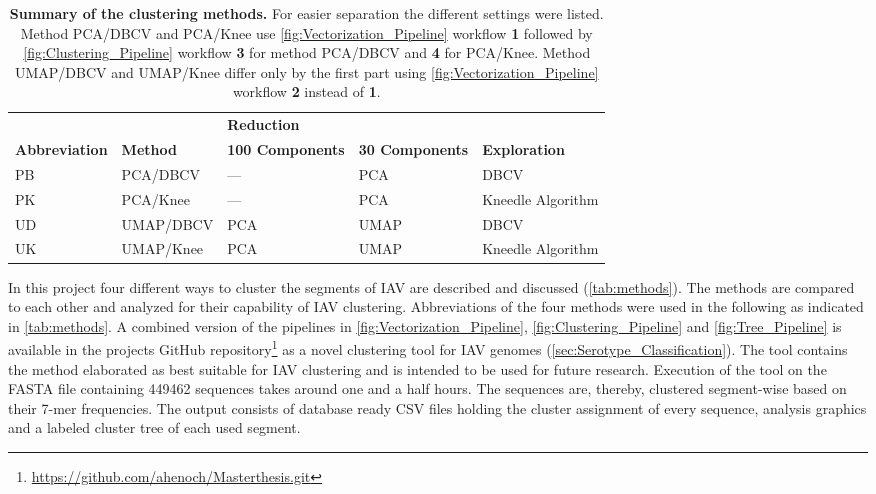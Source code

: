 \begin{table}[!hbt]
    \footnotesize
    \centering
    \caption[Summary of the clustering methods]{\textbf{Summary of the clustering methods.} For easier separation the different settings were listed. Method PCA/DBCV and PCA/Knee use \autoref{fig:Vectorization_Pipeline} workflow \textsf{\textbf{1}} followed by \autoref{fig:Clustering_Pipeline} workflow \textsf{\textbf{3}} for method PCA/DBCV and \textsf{\textbf{4}} for PCA/Knee. Method UMAP/DBCV and UMAP/Knee differ only by the first part using \autoref{fig:Vectorization_Pipeline} workflow \textsf{\textbf{2}} instead of \textsf{\textbf{1}}.}
    \label{tab:methods}
    \begin{tabular*}{\textwidth}{@{\extracolsep{\fill}\hspace{6pt}}lllll}
        \toprule
        & & \multicolumn{2}{l}{\textbf{Reduction}} & \\
        \cmidrule(lr){3-4}
        \textbf{Abbreviation} & \textbf{Method} & \textbf{100 Components} & \textbf{30 Components} & \textbf{Exploration}\\
        \midrule
        PB & PCA/DBCV & --- & PCA & DBCV\\
        PK & PCA/Knee & --- & PCA & Kneedle Algorithm\\
        UD & UMAP/DBCV & PCA & UMAP & DBCV\\
        UK & UMAP/Knee & PCA & UMAP & Kneedle Algorithm\\
        \bottomrule
    \end{tabular*}
\end{table}

In this project four different ways to cluster the segments of \gls{IAV} are described and discussed (\autoref{tab:methods}). The methods are compared to each other and analyzed for their capability of \gls{IAV} clustering. Abbreviations of the four methods were used in the following as indicated in \autoref{tab:methods}. A combined version of the pipelines in \autoref{fig:Vectorization_Pipeline}, \autoref{fig:Clustering_Pipeline} and \autoref{fig:Tree_Pipeline} is available in the projects GitHub repository\footnote{\url{https://github.com/ahenoch/Masterthesis.git}} as a novel clustering tool for \gls{IAV} genomes (\autoref{sec:Serotype_Classification}). The tool contains the method elaborated as best suitable for \gls{IAV} clustering and is intended to be used for future research. Execution of the tool on the FASTA file containing 449462 sequences takes around one and a half hours. The sequences are, thereby, clustered segment-wise based on their 7-mer frequencies. The output consists of database ready CSV files holding the cluster assignment of every sequence, analysis graphics and a labeled cluster tree of each used segment. 

